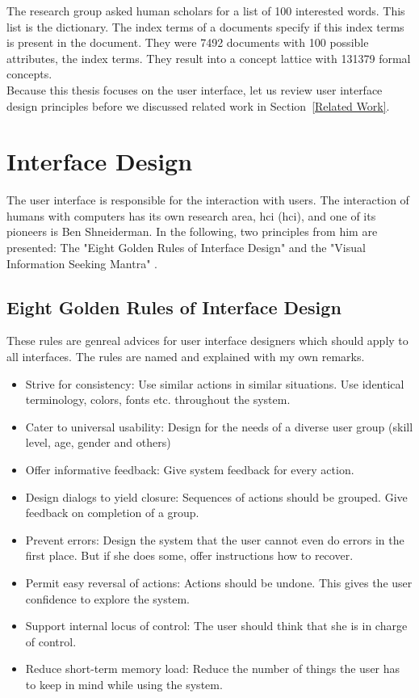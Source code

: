 \documentclass[11pt]{report}
\begin{document}
The research group asked human scholars for a list of 100 interested words. This list is the dictionary. The index terms of a documents specify if this index terms is present in the document. They were 7492 documents with 100 possible attributes, the index terms. They result into a concept lattice with 131379 formal concepts.\\

Because this thesis focuses on the user interface, let us review user interface design principles before we discussed related work in Section~\ref{Related Work}.

\section{Interface Design}
\label{id}

The user interface is responsible for the interaction with users. The interaction of humans with computers has its own research area, \acrlong{hci} (\acrshort{hci}), and one of its pioneers is Ben Shneiderman. In the following, two principles from him are presented: The "Eight Golden Rules of Interface Design" \cite{Shneiderman2010} and the "Visual Information Seeking Mantra" \cite{Shneiderman1996}.

\subsection{Eight Golden Rules of Interface Design}
\label{Golden}

These rules \cite{Shneiderman2010} are genreal advices for user interface designers which should apply to all interfaces. The rules are named and explained with my own remarks. \\

\begin{itemize}
	\item Strive for consistency: Use similar actions in similar situations. Use identical terminology, colors, fonts etc. throughout the system.	
	\item Cater to universal usability: Design for the needs of a diverse user group (skill level, age, gender and others)
	\item Offer informative feedback: Give system feedback for every action.
	\item Design dialogs to yield closure: Sequences of actions should be grouped. Give feedback on completion of a group.
	\item Prevent errors: Design the system that the user cannot even do errors in the first place. But if she does some, offer instructions how to recover.
	\item Permit easy reversal of actions: Actions should be undone. This gives the user confidence to explore the system.
	\item Support internal locus of control: The user should think that she is in charge of control.
	\item Reduce short-term memory load: Reduce the number of things the user has to keep in mind while using the system.
\end{itemize}
\end{document}
